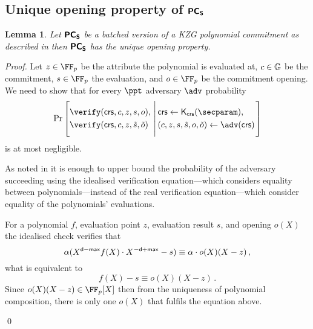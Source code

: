 \let\accentvec\vec \documentclass[runningheads,10pt]{llncs}
\newtheorem{lemma}[theorem]{Lemma}
\begin{document}
\subsection{Unique opening property of $\bm{\mathsf{PC}}_{\bm{\mathsf{S}}}$}
\begin{lemma}
	\label{lem:pcoms_unique_op}
	Let $\bm{\mathsf{PC}}_{\bm{\mathsf{S}}}$ be a batched version of a KZG polynomial commitment
	\cite{AC:KatZavGol10} as described in \cite{CCS:MBKM19} then $\bm{\mathsf{PC}}_{\bm{\mathsf{S}}}$ has the unique opening property. 
\end{lemma}
\begin{proof}
	Let 
	$z \in \FF_p$ be the attribute the polynomial is evaluated at,
	$c \in \mathbb{G}$ be the commitment,  
	$s \in \FF_p$ the evaluation, and 
	$o \in \FF_p$ be the commitment opening. 
	We need to show that for every $\ppt$ adversary $\adv$ probability
	\[
		\Pr
			\left[
				\begin{aligned}
					& \verify(\crs, c, z, s, o), \\
					& \verify(\crs, c, z, \tilde{s}, \tilde{o})
				\end{aligned}
			\,\left|\,
			\vphantom{\begin{aligned}
				& \verify(\crs, c, z, s, o),\\
				& \verify(\crs, c, z, \tilde{s}, \tilde{o}) \\
				&o \neq \tilde{o})
			\end{aligned}}
			\begin{aligned}
				& \crs \gets \kcrs(\secparam), \\
				&	(c, z, s, \tilde{s}, o, \tilde{o}) \gets \adv(\crs)
			\end{aligned}
			\right.\right]
	\]
	is at most negligible.
	
	As noted in \cite[Lemma 2.2]{EPRINT:GabWilCio19} it is enough to upper bound
  the probability of the adversary succeeding using the idealised verification equation---which considers equality between polynomials---instead of the real verification equation---which consider equality of the polynomials' evaluations.
	
	For a polynomial $f$, evaluation point $z$, evaluation result $s$, and opening $o(X)$ the idealised check verifies that
	\begin{equation}
		\alpha (X^{\mathsf{d} - \mathsf{max}}f(X) \cdot X^{-\mathsf{d} + \mathsf{max}} -  s) \equiv \alpha \cdot o(X) (X - z)\,,
	\end{equation}
	what is equivalent to 
	\begin{equation}
		f(X) -  s \equiv o(X) (X - z)\,.
		\label{eq:pcoms_idealised_check}
	\end{equation}
	Since $o(X)(X - z) \in \FF_p[X]$ then from the uniqueness of polynomial composition, there is only one $o(X)$ that fulfils the equation above.

	\qed
\end{proof}
\end{document}
